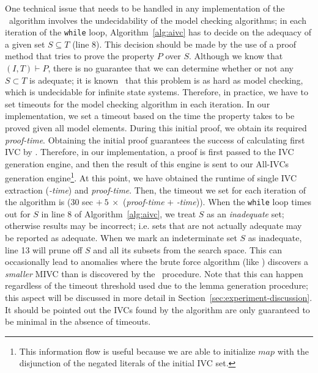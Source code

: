 One technical issue that needs to
be handled in any implementation of the \aivcalg ~algorithm involves the undecidability of the model checking algorithms;
in each iteration of the \texttt{while} loop, Algorithm~\ref{alg:aivc}
has to decide on the adequacy of a given set $S \subseteq T$ (line 8).
This decision should be made by the use of a proof method that
tries to prove the property $P$ over $S$. Although we know that $(I, T) \vdash P$,
there is no guarantee that we can determine whether or not any $S \subset T$ is adequate; it is known~\cite{Ghass16} that
this problem is as hard as model checking, which is undecidable for infinite state systems.
Therefore, in practice, we have to set timeouts for the model checking algorithm in each iteration.
In our implementation, we set a timeout based on the time the property takes to be proved given all model elements.
During this initial proof, we obtain its required \emph{proof-time}. 
Obtaining the initial proof guarantees the success of calculating first IVC by \ucalg. 
Therefore, in our implementation, a proof is first passed to the IVC generation engine, and then the result of this engine is sent to our All-IVCs generation engine\footnote{This information flow is useful because we are able to initialize $map$ with the disjunction of the negated literals of the initial IVC set.}.
At this point, we have obtained the runtime of single IVC extraction (\emph{\ucalg-time}) and \emph{proof-time}.
Then, the timeout we set for each iteration of the algorithm is ($30$ sec  $+\ 5\ \times$ (\emph{proof-time} $+$ \emph{\ucalg-time})). 
When the \texttt{while} loop times out for $S$ in line 8 of Algorithm~\ref{alg:aivc},
we treat $S$ as an \emph{inadequate} set;
otherwise results may be incorrect; i.e. sets that are not actually adequate may be reported as adequate.
When we mark an indeterminate set $S$ as inadequate, line 13 will prune off $S$ and all its subsets from
the search space.  This can occasionally lead to anomalies where the brute force algorithm (like \ucbfalg) discovers a {\em smaller}
MIVC than is discovered by the \aivcalg ~procedure.  Note that this can happen regardless of the timeout threshold used
due to the lemma generation procedure; this aspect will be discussed in more detail in
Section~\ref{sec:experiment-discussion}. It should be pointed out the IVCs found by the algorithm are only guaranteed to be minimal in the absence of timeouts.


%

